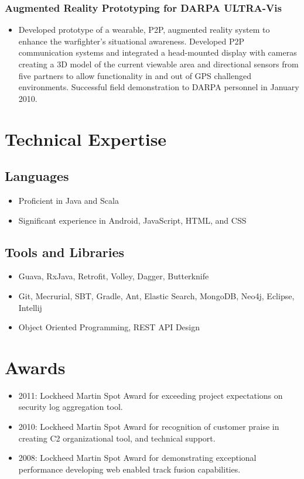 \documentclass[11pt]{article}
\begin{document}
\subsubsection*{Augmented Reality Prototyping for DARPA ULTRA-Vis}
\label{sec-1-4-4}

\begin{itemize}
\item Developed prototype of a wearable, P2P, augmented reality system to enhance the warfighter's situational awareness. Developed P2P communication systems and integrated a head-mounted display with cameras creating a 3D model of the current viewable area and directional sensors from five partners to allow functionality in and out of GPS challenged environments. Successful field demonstration to DARPA personnel in January 2010.
\end{itemize}
\section*{Technical Expertise}
\label{sec-2}
\subsection*{Languages}
\label{sec-2-1}

\begin{itemize}
\item Proficient in Java and Scala
\item Significant experience in Android, JavaScript, HTML, and CSS
\end{itemize}
\subsection*{Tools and Libraries}
\label{sec-2-2}

\begin{itemize}
\item Guava, RxJava, Retrofit, Volley, Dagger, Butterknife
\item Git, Mecrurial, SBT, Gradle, Ant, Elastic Search, MongoDB, Neo4j, Eclipse, Intellij
\item Object Oriented Programming, REST API Design
\end{itemize}
\section*{Awards}
\label{sec-3}

\begin{itemize}
\item 2011: Lockheed Martin Spot Award for exceeding project expectations on security log aggregation tool.
\item 2010: Lockheed Martin Spot Award for recognition of customer praise in creating C2 organizational tool, and technical support.
\item 2008: Lockheed Martin Spot Award for demonstrating exceptional performance developing web enabled track fusion capabilities.
\end{itemize}
\end{document}
